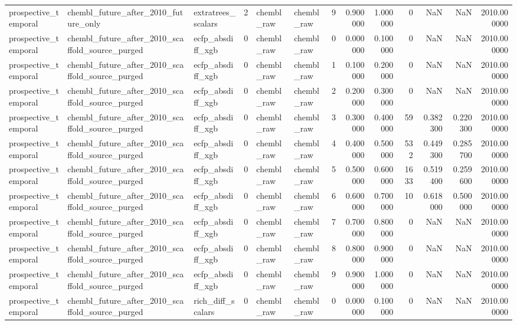 \begin{longtable}{lllrllrrrrrrr}
prospective\_temporal & chembl\_future\_after\_2010\_future\_only & extratrees\_scalars & 2 & chembl\_raw & chembl\_raw & 9 & 0.900000 & 1.000000 & 0 & NaN & NaN & 2010.000000 \\
prospective\_temporal & chembl\_future\_after\_2010\_scaffold\_source\_purged & ecfp\_absdiff\_xgb & 0 & chembl\_raw & chembl\_raw & 0 & 0.000000 & 0.100000 & 0 & NaN & NaN & 2010.000000 \\
prospective\_temporal & chembl\_future\_after\_2010\_scaffold\_source\_purged & ecfp\_absdiff\_xgb & 0 & chembl\_raw & chembl\_raw & 1 & 0.100000 & 0.200000 & 0 & NaN & NaN & 2010.000000 \\
prospective\_temporal & chembl\_future\_after\_2010\_scaffold\_source\_purged & ecfp\_absdiff\_xgb & 0 & chembl\_raw & chembl\_raw & 2 & 0.200000 & 0.300000 & 0 & NaN & NaN & 2010.000000 \\
prospective\_temporal & chembl\_future\_after\_2010\_scaffold\_source\_purged & ecfp\_absdiff\_xgb & 0 & chembl\_raw & chembl\_raw & 3 & 0.300000 & 0.400000 & 59 & 0.382300 & 0.220300 & 2010.000000 \\
prospective\_temporal & chembl\_future\_after\_2010\_scaffold\_source\_purged & ecfp\_absdiff\_xgb & 0 & chembl\_raw & chembl\_raw & 4 & 0.400000 & 0.500000 & 532 & 0.449300 & 0.285700 & 2010.000000 \\
prospective\_temporal & chembl\_future\_after\_2010\_scaffold\_source\_purged & ecfp\_absdiff\_xgb & 0 & chembl\_raw & chembl\_raw & 5 & 0.500000 & 0.600000 & 1633 & 0.519400 & 0.259600 & 2010.000000 \\
prospective\_temporal & chembl\_future\_after\_2010\_scaffold\_source\_purged & ecfp\_absdiff\_xgb & 0 & chembl\_raw & chembl\_raw & 6 & 0.600000 & 0.700000 & 10 & 0.618000 & 0.500000 & 2010.000000 \\
prospective\_temporal & chembl\_future\_after\_2010\_scaffold\_source\_purged & ecfp\_absdiff\_xgb & 0 & chembl\_raw & chembl\_raw & 7 & 0.700000 & 0.800000 & 0 & NaN & NaN & 2010.000000 \\
prospective\_temporal & chembl\_future\_after\_2010\_scaffold\_source\_purged & ecfp\_absdiff\_xgb & 0 & chembl\_raw & chembl\_raw & 8 & 0.800000 & 0.900000 & 0 & NaN & NaN & 2010.000000 \\
prospective\_temporal & chembl\_future\_after\_2010\_scaffold\_source\_purged & ecfp\_absdiff\_xgb & 0 & chembl\_raw & chembl\_raw & 9 & 0.900000 & 1.000000 & 0 & NaN & NaN & 2010.000000 \\
prospective\_temporal & chembl\_future\_after\_2010\_scaffold\_source\_purged & rich\_diff\_scalars & 0 & chembl\_raw & chembl\_raw & 0 & 0.000000 & 0.100000 & 0 & NaN & NaN & 2010.000000 \\

\end{longtable}

